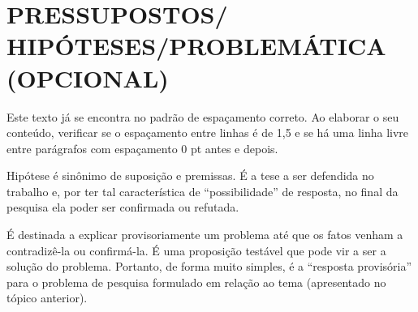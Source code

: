 \chapter{PRESSUPOSTOS/ HIPÓTESES/PROBLEMÁTICA (OPCIONAL)} 
Este texto já se encontra no padrão de espaçamento correto. Ao elaborar o seu conteúdo, verificar se o espaçamento entre linhas é de 1,5 e se há uma linha livre entre parágrafos com espaçamento 0 pt antes e depois. 

Hipótese é sinônimo de suposição e premissas. É a tese a ser defendida no trabalho e, por ter tal característica de “possibilidade” de resposta, no final da pesquisa ela poder ser confirmada ou refutada.  

É destinada a explicar provisoriamente um problema até que os fatos venham a contradizê-la ou confirmá-la. É uma proposição testável que pode vir a ser a solução do problema.\newline
Portanto, de forma muito simples, é a “resposta provisória” para o problema de pesquisa formulado em relação ao tema (apresentado no tópico anterior).   

